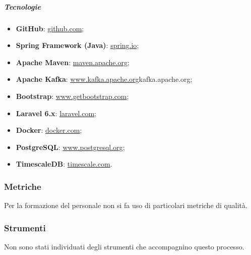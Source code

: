 		\subparagraph{Tecnologie}
		\begin{itemize}
			\item \textbf{GitHub}: \href{https://guides.github.com}{github.com};
			\item \textbf{Spring Framework (Java)}: \href{https://spring.io/guides/gs/rest-service}{spring.io};
			\item \textbf{Apache Maven}: \href{https://maven.apache.org/guides/getting-started}{maven.apache.org};
			\item \textbf{Apache Kafka}: \href{https://kafka.apache.org/}{www.kafka.apache.org}{kafka.apache.org};
			\item \textbf{Bootstrap}: \href{https://getbootstrap.com/}{www.getbootstrap.com};
			\item \textbf{Laravel 6.x}: \href{https://laravel.com/docs/6.x}{laravel.com};
			\item \textbf{Docker}: \href{https://docs.docker.com/get-started}{docker.com};
			\item \textbf{PostgreSQL}: \href{https://www.postgresql.org/docs/12}{www.postgresql.org}; 
			\item \textbf{TimescaleDB}: \href{https://docs.timescale.com/latest/getting-started}{timescale.com}.
		\end{itemize}


	\subsubsection{Metriche}
		Per la formazione del personale non si fa uso di particolari metriche di qualità.

	\subsubsection{Strumenti}
		Non sono stati individuati degli strumenti che accompagnino questo processo.
